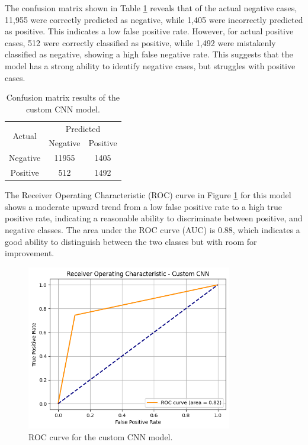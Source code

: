 \documentclass[../main]{subfiles}
\begin{document}
\noindent The confusion matrix shown in Table \ref{tab:confusion-matrix-custom-cnn} reveals that of the actual negative cases, 11,955 were correctly predicted as negative, while 1,405 were incorrectly predicted as positive. This indicates a low false positive rate. However, for actual positive cases, 512 were correctly classified as positive, while 1,492 were mistakenly classified as negative, showing a high false negative rate. This suggests that the model has a strong ability to identify negative cases, but struggles with positive cases.

\begin{table}[h!]
    \centering
    \begin{tabular}{|c|c|c|}
        \hline
        \multirow{2}{*}{Actual} & \multicolumn{2}{c|}{Predicted} \\ \cline{2-3}
                                & Negative         & Positive         \\ \hline
        Negative                & 11955            & 1405              \\ \hline
        Positive                & 512              & 1492              \\ \hline
    \end{tabular}
    \caption{Confusion matrix results of the custom CNN model.}
    \label{tab:confusion-matrix-custom-cnn}
\end{table}

\noindent The Receiver Operating Characteristic (ROC) curve in Figure \ref{fig:roc-custom-cnn} for this model shows a moderate upward trend from a low false positive rate to a high true positive rate, indicating a reasonable ability to discriminate between positive, and negative classes. The area under the ROC curve (AUC) is 0.88, which indicates a good ability to distinguish between the two classes but with room for improvement.

\begin{figure}[h!]
	\centering
	\includegraphics[width=0.8\textwidth]{assets/roc_custom_cnn.png}
	\caption{ROC curve for the custom CNN model.}
    \label{fig:roc-custom-cnn}
\end{figure}
\end{document}
